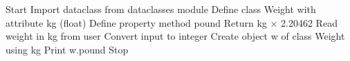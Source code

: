 \begin{algorithm}
\caption{Convert Kilogram to Pound Using Dataclass}
\begin{algorithmic}[1]

\STATE Start
\STATE Import dataclass from dataclasses module
\STATE Define class Weight with attribute kg (float)
\STATE Define property method pound
\STATE \hspace{0.5cm} Return kg $\times$ 2.20462
\STATE Read weight in kg from user
\STATE Convert input to integer
\STATE Create object w of class Weight using kg
\STATE Print w.pound
\STATE Stop

\end{algorithmic}
\end{algorithm}